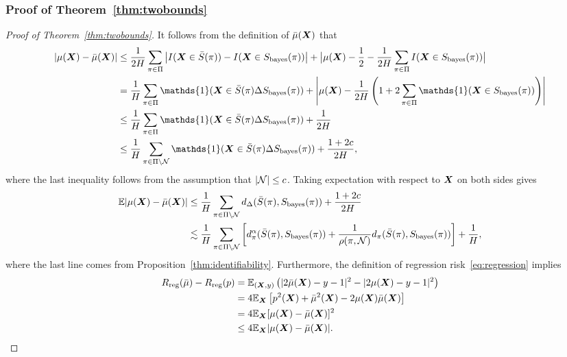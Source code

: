 \documentclass[11pt]{article}
\theoremstyle{plain}
\theoremstyle{definition}
\def\bayesS{S_{\textup{bayes}}}
\begin{document}
\subsubsection{Proof of Theorem~\ref{thm:twobounds}}
\begin{proof}[Proof of Theorem~\ref{thm:twobounds}]
It follows from the definition of $\bar \mu(\bm X)$ that
\begin{align}
|\mu(\mX)-\bar \mu(\mX)| &\leq {1\over 2H}\sum_{\pi \in \Pi}\left|I(\mX\in \bar S(\pi)) -I(\mX\in \bayesS(\pi))\right| + \big|\mu(\mX) - {1\over 2}-{1\over 2H}\sum_{\pi \in \Pi}I(\mX\in \bayesS(\pi))\big|\\
&= {1\over H}\sum_{\pi \in \Pi}\mathds{1}(\mX \in \bar S(\pi) \Delta \bayesS(\pi))+\left| \mu(\mX)-  {1\over 2H}\left(1+2\sum_{\pi \in \Pi}\mathds{1}(\mX \in \bayesS(\pi))\right) \right|\\
&\leq  {1\over H}\sum_{\pi \in \Pi}\mathds{1}(\mX \in \bar S(\pi) \Delta \bayesS(\pi))+ {1\over 2H}\\&\leq\frac{1}{H}\sum_{\pi\in\Pi\setminus\tN}\mathds{1}(\mX \in \bar S(\pi) \Delta \bayesS(\pi))+ {1+2c\over 2H},
\end{align}
where the last inequality follows from the assumption that $|\mathcal{N}|\leq c$.
Taking expectation with respect to $\bm X$ on both sides gives
\begin{align}
\mathbb{E}|\mu(\mX)-\bar \mu(\mX)|&\leq \frac{1}{H}\sum_{\pi\in\Pi\setminus\tN}d_\Delta(\bar S(\pi), \bayesS(\pi))+{1+2c\over 2H}\\&\lesssim \frac{1}{H}\sum_{\pi\in\Pi\setminus\tN}\left[d_\pi^\alpha(\bar S(\pi), \bayesS(\pi))+\frac{1}{\rho(\pi,\tN)}d_\pi(\bar S(\pi), \bayesS(\pi))\right]+{1\over H},
\end{align}
where the last line comes from Proposition~\ref{thm:identifiability}. 
Furthermore, the definition of regression risk~\eqref{eq:regression} implies
\begin{align}
R_\text{reg}(\bar \mu)-R_\text{reg}(p)&=\mathbb{E}_{(\bm X,y)}\left(|2\bar \mu(\bm X)-y-1|^2-|2\mu(\bm X)-y-1|^2\right)\\
&= 4\mathbb{E}_{\bm X}\left[p^2(\bm X)+\bar \mu^2(\bm X)-2\mu(\bm X)\bar \mu(\bm X)\right]\\
&=4\mathbb{E}_{\bm X}[\mu(\bm X)-\bar \mu(\bm X)]^2\\
&\leq 4\mathbb{E}_{\bm X}|\mu(\bm X)-\bar \mu(\bm X)|.
\end{align}
\end{proof}
\end{document}
